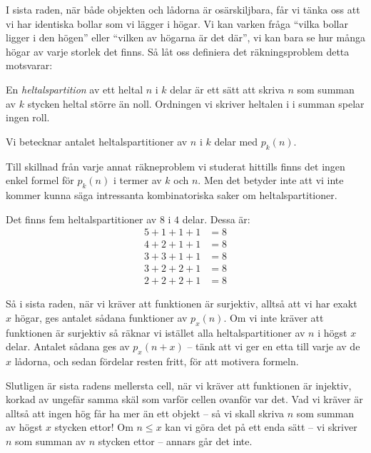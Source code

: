 \documentclass[nobib]{tufte-handout}
\begin{document}
I sista raden, när både objekten och lådorna är osärskiljbara, får vi tänka oss att vi har identiska bollar som vi lägger i högar. Vi kan varken fråga ``vilka bollar ligger i den högen'' eller ``vilken av högarna är det där'', vi kan bara se hur många högar av varje storlek det finns. Så låt oss definiera det räkningsproblem detta motsvarar:

\begin{definition}
  En \emph{heltalspartition} av ett heltal $n$ i $k$ delar är ett sätt att skriva $n$ som summan av $k$ stycken heltal större än noll. Ordningen vi skriver heltalen i i summan spelar ingen roll. 
  
  Vi betecknar antalet heltalspartitioner av $n$ i $k$ delar med $p_k(n)$.
\end{definition}

Till skillnad från varje annat räkneproblem vi studerat hittills finns det ingen enkel formel för $p_k(n)$ i termer av $k$ och $n$. Men det betyder inte att vi inte kommer kunna säga intressanta kombinatoriska saker om heltalspartitioner.

\begin{example}
  Det finns fem heltalspartitioner av $8$ i $4$ delar. Dessa är:
  \begin{align*}
    5 + 1 + 1 + 1 &= 8\\
    4 + 2 + 1 + 1 &= 8\\
    3 + 3 + 1 + 1 &= 8\\
    3 + 2 + 2 + 1 &= 8\\
    2 + 2 + 2 + 1 &= 8
  \end{align*}
\end{example}

Så i sista raden, när vi kräver att funktionen är surjektiv, alltså att vi har exakt $x$ högar, ges antalet sådana funktioner av $p_x(n)$. Om vi inte kräver att funktionen är surjektiv så räknar vi istället alla heltalspartitioner av $n$ i högst $x$ delar. Antalet sådana ges av $p_x(n+x)$ -- tänk att vi ger en etta till varje av de $x$ lådorna, och sedan fördelar resten fritt, för att motivera formeln.

Slutligen är sista radens mellersta cell, när vi kräver att funktionen är injektiv, korkad av ungefär samma skäl som varför cellen ovanför var det. Vad vi kräver är alltså att ingen hög får ha mer än ett objekt -- så vi skall skriva $n$ som summan av högst $x$ stycken ettor! Om $n \leq x$ kan vi göra det på ett enda sätt -- vi skriver $n$ som summan av $n$ stycken ettor -- annars går det inte.
\end{document}
